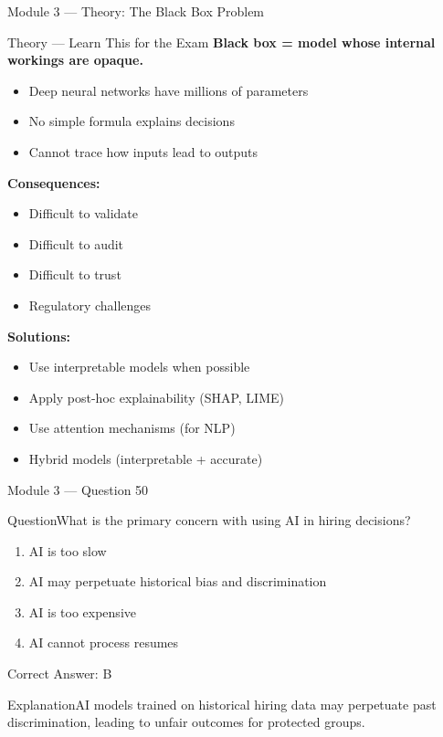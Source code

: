 \documentclass[aspectratio=169,10pt]{beamer}
\newcommand{\question}[1]{\begin{block}{Question}#1\end{block}}
\newcommand{\options}[4]{%
	\begin{enumerate}[label=\Alph*.,leftmargin=*]
		\item #1
		\item #2
		\item #3
		\item #4
	\end{enumerate}
}
\newcommand{\answerbox}[1]{\begin{exampleblock}{Correct Answer: #1}\end{exampleblock}}
\newcommand{\explain}[1]{\begin{block}{Explanation}#1\end{block}}
\newcommand{\theory}[1]{%
	\begin{block}{Theory --- Learn This for the Exam}
		\small #1
	\end{block}
}
\begin{document}
	\begin{frame}{Module 3 --- Theory: The Black Box Problem}
		\theory{
			\textbf{Black box = model whose internal workings are opaque.}
			\begin{itemize}
				\item Deep neural networks have millions of parameters
				\item No simple formula explains decisions
				\item Cannot trace how inputs lead to outputs
			\end{itemize}
			\textbf{Consequences:}
			\begin{itemize}
				\item Difficult to validate
				\item Difficult to audit
				\item Difficult to trust
				\item Regulatory challenges
			\end{itemize}
			\textbf{Solutions:}
			\begin{itemize}
				\item Use interpretable models when possible
				\item Apply post-hoc explainability (SHAP, LIME)
				\item Use attention mechanisms (for NLP)
				\item Hybrid models (interpretable + accurate)
			\end{itemize}
		}
	\end{frame}
	
	\begin{frame}{Module 3 --- Question 50}
		\question{What is the primary concern with using AI in hiring decisions?}
		\options{AI is too slow}{AI may perpetuate historical bias and discrimination}{AI is too expensive}{AI cannot process resumes}
		\answerbox{B}
		\explain{AI models trained on historical hiring data may perpetuate past discrimination, leading to unfair outcomes for protected groups.}
	\end{frame}
	
\end{document}
